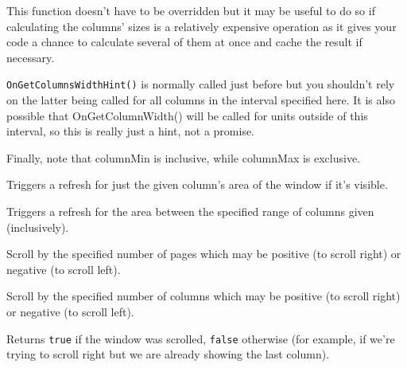 
This function doesn't have to be overridden but it may be useful to do so if
calculating the columns' sizes is a relatively expensive operation as it gives
your code a chance to calculate several of them at once and cache the result
if necessary.

{\tt OnGetColumnsWidthHint()} is normally called just before
 but you
shouldn't rely on the latter being called for all columns in the interval
specified here. It is also possible that OnGetColumnWidth() will be called for
units outside of this interval, so this is really just a hint, not a promise.

Finally, note that columnMin is inclusive, while columnMax is exclusive.


\label{wxvarhscrollhelperrefreshcolumn}


Triggers a refresh for just the given column's area of the window if it's visible.


\label{wxvarhscrollhelperrefreshcolumns}


Triggers a refresh for the area between the specified range of columns given
(inclusively).


\label{wxvarhscrollhelperscrollcolumnpages}


Scroll by the specified number of pages which may be positive (to scroll right)
or negative (to scroll left).


\label{wxvarhscrollhelperscrollcolumns}


Scroll by the specified number of columns which may be positive (to scroll right)
or negative (to scroll left).

Returns {\tt true} if the window was scrolled, {\tt false} otherwise (for
example, if we're trying to scroll right but we are already showing the last
column).


